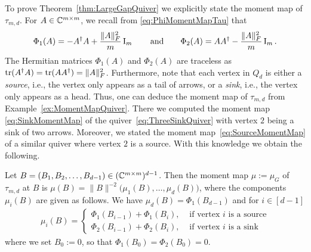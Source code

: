 To prove Theorem~\ref{thm:LargeGapQuiver} we explicitly state the moment map of $\tau_{m,d}$. For $A \in \mathbb C^{m \times m}$, we recall from \eqref{eq:PhiMomentMapTau} that
	\begin{equation}
		\Phi_1(A) = - A^{\dagger} A + \frac{\|A\|^2_F}{m} \operatorname{I}_m  \qquad \text{and} \qquad
		\Phi_2(A) = A A^{\dagger} - \frac{\|A\|^2_F}{m} \operatorname{I}_m .
	\end{equation}
The Hermitian matrices $\Phi_1(A)$ and $\Phi_2(A)$ are traceless as $\operatorname{tr}(A^{\dagger} A) = \operatorname{tr}(A A^{\dagger}) = \|A\|_F^2$. Furthermore, note that each vertex in $Q_d$ is either a \emph{source}, i.e., the vertex only appears as a tail of arrows, or a \emph{sink}, i.e., the vertex only appears as a head.
Thus, one can deduce the moment map of $\tau_{m,d}$ from Example~\ref{ex:MomentMapQuiver}. There we computed the moment map \eqref{eq:SinkMomentMap} of the quiver~\eqref{eq:ThreeSinkQuiver} with vertex $2$ being a sink of two arrows. Moreover, we stated the moment map~\eqref{eq:SourceMomentMap} of a similar quiver where vertex $2$ is a source. With this knowledge we obtain the following.

\begin{lemma} \label{lem:MomentMapTauMD}
	Let $B = (B_1,B_2,\ldots,B_{d-1})\in (\mathbb C^{m \times m})^{d-1}$. Then the moment map $\mu := \mu_G$ of $\tau_{m,d}$ at $B$ is $\mu(B) = \|B\|^{-2} \big( \mu_1(B), \ldots, \mu_d(B) \big)$, where the components $\mu_i(B)$ are given as follows. We have $\mu_d(B) = \Phi_1(B_{d-1})$ and for $i \in [d-1]$
	\begin{align*}
		\mu_i(B) = \begin{cases} \Phi_1(B_{i-1}) + \Phi_1(B_i), & \text{ if vertex } i \text{ is a source} \\
							\Phi_2(B_{i-1}) + \Phi_2(B_i), & \text{ if vertex } i \text{ is a sink} \end{cases}
	\end{align*}
	where we set $B_0 := 0$, so that $\Phi_1(B_0) = \Phi_2(B_0) = 0$.
\end{lemma}

